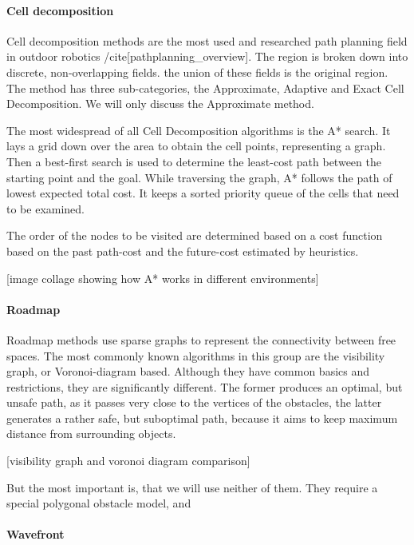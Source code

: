 \paragraph{Cell decomposition}

Cell decomposition methods are the most used and researched path planning field in outdoor robotics /cite[pathplanning_overview]. The region is broken down into discrete, non-overlapping fields. the union of these fields is the original region. The method has three sub-categories, the Approximate, Adaptive and Exact Cell Decomposition. We will only discuss the Approximate method.

The most widespread of all Cell Decomposition algorithms is the A* search. It lays a grid down over the area to obtain the cell points, representing a graph. Then a best-first search is used to determine the least-cost path between the starting point and the goal. While traversing the graph, A* follows the path of lowest expected total cost. It keeps a sorted priority queue of the cells that need to be examined.

The order of the nodes to be visited are determined based on a cost function based on the past path-cost and the future-cost estimated by heuristics.

[image collage showing how A* works in different environments]

\paragraph{Roadmap}

Roadmap methods use sparse graphs to represent the connectivity between free spaces. The most commonly known algorithms in this group are the visibility graph, or Voronoi-diagram based. Although they have common basics and restrictions, they are significantly different. The former produces an optimal, but unsafe path, as it passes very close to the vertices of the obstacles, the latter generates a rather safe, but suboptimal path, because it aims to keep maximum distance from surrounding objects.

[visibility graph and voronoi diagram comparison]

But the most important is, that we will use neither of them. They require a special polygonal obstacle model, and 

\paragraph{Wavefront}

